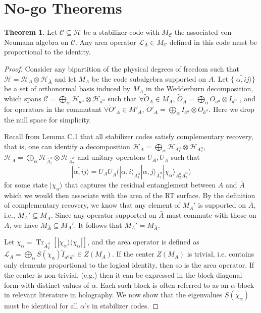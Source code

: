 \documentclass[%
 reprint,
superscriptaddress,
nofootinbib,
 amsmath,amssymb,
 aps,
prx,
floatfix,
]{revtex4-2}
\theoremstyle{definition}
\newtheorem{theorem}{Theorem}[section]
\numberwithin{equation}{section}
\DeclareMathOperator{\Tr}{Tr}
\begin{document}
\section{No-go Theorems}
\begin{theorem}\label{thm:1}
Let $\mathcal{C}\subseteq \mathcal{H}$ be a stabilizer code with $M_{\mathcal{C}}$ the associated von Neumann algebra on $\mathcal{C}$. Any area operator ${\mathcal{L}}_{A}\in M_{\mathcal{C}}$ defined in this code must be proportional to the identity.
\end{theorem}
\begin{proof}
Consider any bipartition  of the physical degrees of freedom such that $\mathcal{H}=\mathcal{H}_A\otimes \mathcal{H}_{\bar{A}}$ and let $M_A$ be the code subalgebra supported on $A$. Let $\{|\widetilde{\alpha,ij}\rangle\}$ be a set of orthonormal basis  induced by $M_A$ in the Wedderburn decomposition, which spans $\mathcal{C}=\bigoplus_{\alpha}\mathcal{H}_{a^{\alpha}}\otimes \mathcal{H}_{\bar{a}^{\alpha}}$ such that $\forall\tilde{O}_A\in M_A$, $\tilde{O}_A=\bigoplus_{\alpha}O_{a^{\alpha}}\otimes I_{\bar{a}^{\alpha}}$ , and for operators in the commutant $\forall \tilde{O}'_A\in M'_{{A}}$, $\tilde{O}'_A=\bigoplus_{\alpha}I_{{a}^{\alpha}}\otimes O_{\bar{a}^{\alpha}}$. Here we drop the null space for simplicity.

Recall from \cite{Pollack:2021yij} Lemma C.1 that all stabilizer codes satisfy complementary recovery, that is, one can identify a decomposition $\mathcal{H}_A=\bigoplus_{\alpha}\mathcal{H}_{A_1^{\alpha}}\otimes\mathcal{H}_{A_2^{\alpha}}$,$\mathcal{H}_{\bar{A}}=\bigoplus_{\alpha}\mathcal{H}_{\bar{A}_1^{\alpha}}\otimes\mathcal{H}_{\bar{A}_2^{\alpha}}$
and unitary operators $U_A,U_{\bar{A}}$ such that
\begin{equation}
    |\widetilde{\alpha,ij}\rangle = U_AU_{\bar{A}} \Big(|\alpha,i\rangle_{A_1^{\alpha}}|\alpha,j\rangle_{\bar{A}_1^{\alpha}}|\chi_{\alpha}\rangle_{A_2^{\alpha}\bar{A}_2^{\alpha}}\Big)
\end{equation} 
for some state $|\chi_{\alpha}\rangle$ that captures the residual entanglement between $A$ and $\bar{A}$ which we would then associate with the area of the RT surface.
By the definition of complementary recovery\cite{Harlow:2016vwg}, we know that any element of $M_A'$ is supported on $\bar{A}$, i.e., $M_A'\subseteq M_{\bar{A}}$. Since any operator supported on $\bar{A}$ must commute with those on $A$, we have $M_{\bar{A}}\subseteq M_A'$. It follows that $M_A'=M_{\bar{A}}$.

Let $\chi_{\alpha}=\Tr_{\bar{A}_2^{\alpha}}[|\chi_{\alpha}\rangle\langle\chi_{\alpha}|]$, and the area operator is defined as $\mathcal{L}_A=\bigoplus_{\alpha}S(\chi_{\alpha})\tilde{I}_{a^{\alpha}\bar{a}^{\alpha}}\in Z(M_A)$.
If the center $Z(M_A)$ is trivial, i.e. contains only elements proportional to the logical identity, then so is the area operator. If the center is non-trivial, (e.g.\cite{Donnelly:2016qqt,Cao:2020ksw,Pollack:2021yij}) then 
it can be expressed in the block diagonal form with distinct values of $\alpha$. Each such block is often referred to as an $\alpha$-block in relevant literature in holography.  
We now show that the eigenvalues $S(\chi_{\alpha})$ must be identical for all $\alpha$'s in stabilizer codes. 



\end{proof}
\end{document}
